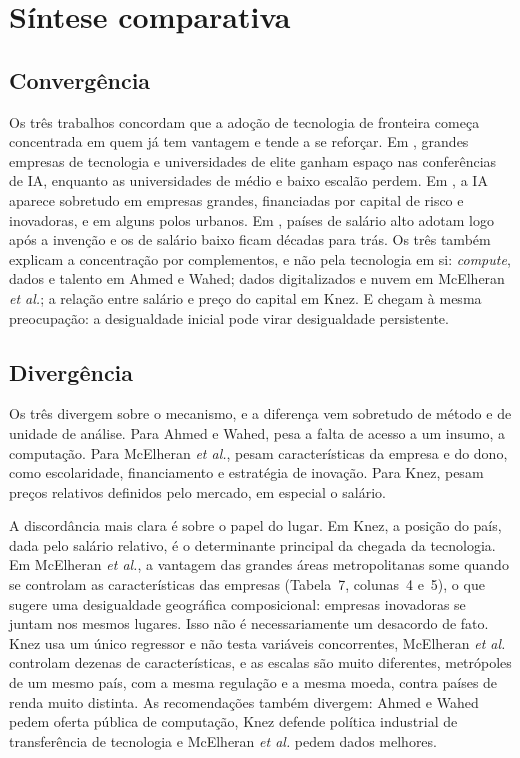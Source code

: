 \section{Síntese comparativa}

\subsection*{Convergência}
Os três trabalhos concordam que a adoção de tecnologia de fronteira começa concentrada em quem já
tem vantagem e tende a se reforçar. Em \textcite{ahmed2020}, grandes empresas de tecnologia e
universidades de elite ganham espaço nas conferências de IA, enquanto as universidades de médio e
baixo escalão perdem. Em \textcite{mcelheran2024}, a IA aparece sobretudo em empresas grandes,
financiadas por capital de risco e inovadoras, e em alguns polos urbanos. Em \textcite{knez2023},
países de salário alto adotam logo após a invenção e os de salário baixo ficam décadas para trás.
Os três também explicam a concentração por complementos, e não pela tecnologia em si:
\emph{compute}, dados e talento em Ahmed e Wahed; dados digitalizados e nuvem em McElheran
\emph{et al.}; a relação entre salário e preço do capital em Knez. E chegam à mesma preocupação: a
desigualdade inicial pode virar desigualdade persistente.

\subsection*{Divergência}
Os três divergem sobre o mecanismo, e a diferença vem sobretudo de método e de unidade de análise.
Para Ahmed e Wahed, pesa a falta de acesso a um insumo, a computação. Para McElheran \emph{et al.},
pesam características da empresa e do dono, como escolaridade, financiamento e estratégia de
inovação. Para Knez, pesam preços relativos definidos pelo mercado, em especial o salário.

A discordância mais clara é sobre o papel do lugar. Em Knez, a posição do país, dada pelo salário
relativo, é o determinante principal da chegada da tecnologia. Em McElheran \emph{et al.}, a
vantagem das grandes áreas metropolitanas some quando se controlam as características das
empresas (Tabela~7, colunas~4 e~5), o que sugere uma desigualdade geográfica composicional:
empresas inovadoras se juntam nos mesmos lugares. Isso não é necessariamente um desacordo de fato.
Knez usa um único regressor e não testa variáveis concorrentes, McElheran \emph{et al.} controlam
dezenas de características, e as escalas são muito diferentes, metrópoles de um mesmo país, com a
mesma regulação e a mesma moeda, contra países de renda muito distinta. As recomendações também
divergem: Ahmed e Wahed pedem oferta pública de computação, Knez defende política industrial de
transferência de tecnologia e McElheran \emph{et al.} pedem dados melhores.

